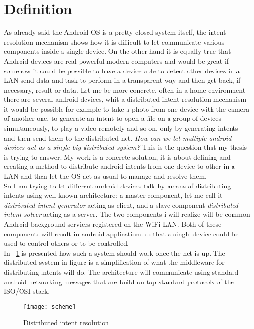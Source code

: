 \section{Definition} \label{problemdefinition}
As already said the Android OS is a pretty closed system itself, the intent resolution mechanism shows how it is difficult to let communicate various components inside a single device. On the other hand it is equally true that Android devices are real powerful modern computers and would be great if somehow it could be possible to have a device able to detect other devices in a LAN send data and task to perform in a transparent way and then get back, if necessary, result or data. Let me be more concrete, often in a home environment there are several android devices, whit a distributed intent resolution mechanism it would be possible for example to take a photo from one device with the camera of another one, to generate an intent to open a file on a group of devices simultaneously, to play a video remotely and so on, only by generating intents and then send them to the distributed net. \textit{How can we let multiple android devices act as a single big distributed system?} This is the question that my thesis is trying to answer. My work is a concrete solution, it is about defining and creating a method to distribute android intents from one device to other in a LAN and then let the OS act as usual to manage and resolve them.\\
So I am trying to let different android devices talk by means of distributing intents using  well known architecture: a master component, let me call it \textit{distributed intent generator} acting as client, and a slave component \textit{distributed intent solver} acting as a server. The two components i will realize will be common Android background services registered on the WiFi LAN. Both of these components will result in android applications so that a single device could be used to control others or to be controlled.\\
In \figurename~\ref{fig:3.1} is presented how such a system should work once the net is up. The distributed system in figure is a simplification of what the middleware for distributing intents will do. The architecture will communicate using standard android networking messages that are build on top standard protocols of the ISO/OSI stack.
 
\begin{figure}[h]
	\centering
	\texttt{[image: scheme]}
	\caption{Distributed intent resolution}
	\label{fig:3.1}
\end{figure}

